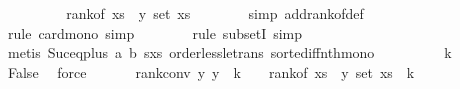\begin{isabellebody}
\ \ \ \ \isamarkupfalse%
\ \isamarkupfalse%
\ {\isachardoublequoteopen}{\isachardot}{\kern0pt}{\isachardot}{\kern0pt}{\isachardot}{\kern0pt}\ {\isasymle}\ rank{\isacharunderscore}{\kern0pt}of\ {\isacharparenleft}{\kern0pt}xs\ {\isacharbang}{\kern0pt}\ y{\isacharparenright}{\kern0pt}\ {\isacharparenleft}{\kern0pt}set\ xs{\isacharparenright}{\kern0pt}{\isachardoublequoteclose}\isanewline
\ \ \ \ \ \ \isamarkupfalse%
\ {\isacharparenleft}{\kern0pt}simp\ add{\isacharcolon}{\kern0pt}rank{\isacharunderscore}{\kern0pt}of{\isacharunderscore}{\kern0pt}def{\isacharparenright}{\kern0pt}\isanewline
\ \ \ \ \ \ \isamarkupfalse%
\ {\isacharparenleft}{\kern0pt}rule\ card{\isacharunderscore}{\kern0pt}mono{\isacharcomma}{\kern0pt}\ simp{\isacharparenright}{\kern0pt}\isanewline
\ \ \ \ \ \ \isamarkupfalse%
\ {\isacharparenleft}{\kern0pt}rule\ subsetI{\isacharcomma}{\kern0pt}\ simp{\isacharparenright}{\kern0pt}\isanewline
\ \ \ \ \ \ \isamarkupfalse%
\ {\isacharparenleft}{\kern0pt}metis\ Suc{\isacharunderscore}{\kern0pt}eq{\isacharunderscore}{\kern0pt}plus{}\ a\ b\ s{\isacharunderscore}{\kern0pt}xs\ order{\isacharunderscore}{\kern0pt}less{\isacharunderscore}{\kern0pt}le{\isacharunderscore}{\kern0pt}trans\ sorted{\isacharunderscore}{\kern0pt}iff{\isacharunderscore}{\kern0pt}nth{\isacharunderscore}{\kern0pt}mono{\isacharparenright}{\kern0pt}\isanewline
\ \ \ \ \isamarkupfalse%
\ \isamarkupfalse%
\ {\isachardoublequoteopen}{\isachardot}{\kern0pt}{\isachardot}{\kern0pt}{\isachardot}{\kern0pt}\ {\isacharless}{\kern0pt}\ k{\isacharplus}{\kern0pt}{}{\isachardoublequoteclose}\isanewline
\ \ \ \ \isamarkupfalse%
\ \isamarkupfalse%
\ {\isachardoublequoteopen}False{\isachardoublequoteclose}\ \isamarkupfalse%
\ force\isanewline
\ \ \isamarkupfalse%
\isanewline
\isanewline
\ \ \isamarkupfalse%
\ rank{\isacharunderscore}{\kern0pt}conv{\isacharunderscore}{\kern0pt}{}{\isacharcolon}{\kern0pt}\ {\isachardoublequoteopen}{\isasymAnd}y{\isachardot}{\kern0pt}\ y\ {\isacharless}{\kern0pt}\ k\ {\isacharplus}{\kern0pt}\ {}\ {\isasymLongrightarrow}\ rank{\isacharunderscore}{\kern0pt}of\ {\isacharparenleft}{\kern0pt}xs\ {\isacharbang}{\kern0pt}\ y{\isacharparenright}{\kern0pt}\ {\isacharparenleft}{\kern0pt}set\ xs{\isacharparenright}{\kern0pt}\ {\isacharless}{\kern0pt}\ k{\isacharplus}{\kern0pt}{}{\isachardoublequoteclose}\isanewline

\end{isabellebody}
